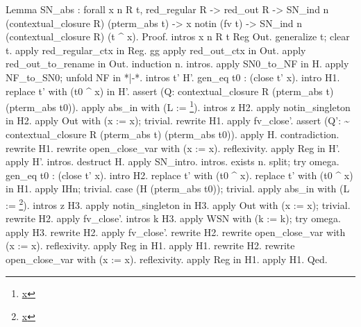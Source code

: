 \documentclass[12pt]{report}
\begin{document}
Lemma SN\_abs : forall x n R t, red\_regular R -> red\_out R -> 
               SN\_ind n (contextual\_closure R) (pterm\_abs t) ->
               x notin (fv t) -> SN\_ind n (contextual\_closure R) (t \^{} x).
Proof.
 intros x n R t Reg Out.
 generalize t; clear t.
 apply red\_regular\_ctx in Reg. gg
 apply red\_out\_ctx in Out. 
 apply red\_out\_to\_rename in Out.
 induction n. intros. 
 apply SN0\_to\_NF in H. 
 apply NF\_to\_SN0; unfold NF in *|-*.
 intros t' H'. gen\_eq t0 : (close t' x). intro H1.
 replace t' with (t0 \^{} x) in H'.
 assert (Q: contextual\_closure R (pterm\_abs t) (pterm\_abs t0)).
    apply abs\_in with (L := \footnote{\url{x}}). intros z H2. 
    apply notin\_singleton in H2. apply Out with (x := x); trivial.
    rewrite H1. apply fv\_close'.
 assert (Q': \~{} contextual\_closure R (pterm\_abs t) (pterm\_abs t0)).
    apply H.
 contradiction. rewrite H1. rewrite open\_close\_var with (x := x).
 reflexivity. apply Reg in H'. apply H'.
 intros. destruct H. apply SN\_intro.
 intros. exists n. split; try omega.
 gen\_eq t0 : (close t' x). intro H2.
 replace t' with (t0 \^{} x). replace t' with (t0 \^{} x) in H1.
 apply IHn; trivial. case (H (pterm\_abs t0)); trivial.
 apply abs\_in with (L := \footnote{\url{x}}).
 intros z H3. apply notin\_singleton in H3. 
 apply Out with (x := x); trivial.
 rewrite H2. apply fv\_close'.
 intros k H3. apply WSN with (k := k); try omega.
 apply H3. rewrite H2. apply fv\_close'.
 rewrite H2. rewrite open\_close\_var with (x := x).
 reflexivity. apply Reg in H1. apply H1.
 rewrite H2. rewrite open\_close\_var with (x := x).
 reflexivity. apply Reg in H1. apply H1. 
Qed.
\end{document}
